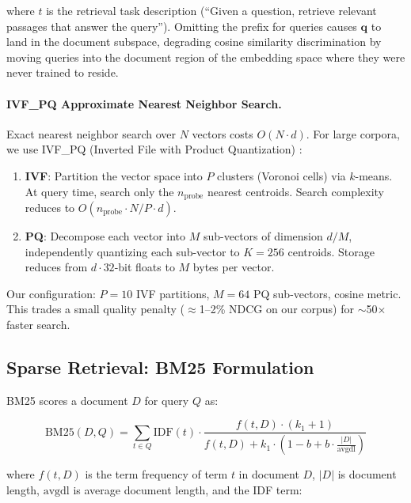 \documentclass[11pt]{article}
\begin{document}
where $t$ is the retrieval task description (``Given a question, retrieve relevant
passages that answer the query''). Omitting the prefix for queries causes $\mathbf{q}$
to land in the document subspace, degrading cosine similarity discrimination by
moving queries into the document region of the embedding space where they were never
trained to reside.

\paragraph{IVF\_PQ Approximate Nearest Neighbor Search.}
Exact nearest neighbor search over $N$ vectors costs $O(N \cdot d)$. For large corpora,
we use IVF\_PQ (Inverted File with Product Quantization) \citep{johnson2019faiss}:

\begin{enumerate}[leftmargin=2em, itemsep=2pt]
  \item \textbf{IVF}: Partition the vector space into $P$ clusters (Voronoi cells) via
  $k$-means. At query time, search only the $n_{\text{probe}}$ nearest centroids.
  Search complexity reduces to $O(n_{\text{probe}} \cdot N/P \cdot d)$.
  \item \textbf{PQ}: Decompose each vector into $M$ sub-vectors of dimension $d/M$,
  independently quantizing each sub-vector to $K=256$ centroids. Storage reduces from
  $d \cdot 32$-bit floats to $M$ bytes per vector.
\end{enumerate}

Our configuration: $P=10$ IVF partitions, $M=64$ PQ sub-vectors, cosine metric.
This trades a small quality penalty ($\approx$1--2\% NDCG on our corpus) for $\sim$50$\times$
faster search.

\subsection{Sparse Retrieval: BM25 Formulation}

BM25 \citep{robertson1976relevance} scores a document $D$ for query $Q$ as:

\begin{equation}
  \text{BM25}(D, Q) = \sum_{t \in Q} \text{IDF}(t) \cdot
  \frac{f(t, D) \cdot (k_1 + 1)}{f(t, D) + k_1 \cdot \left(1 - b + b \cdot \frac{|D|}{\text{avgdl}}\right)}
\end{equation}

where $f(t, D)$ is the term frequency of term $t$ in document $D$, $|D|$ is document
length, $\text{avgdl}$ is average document length, and the IDF term:
\end{document}
